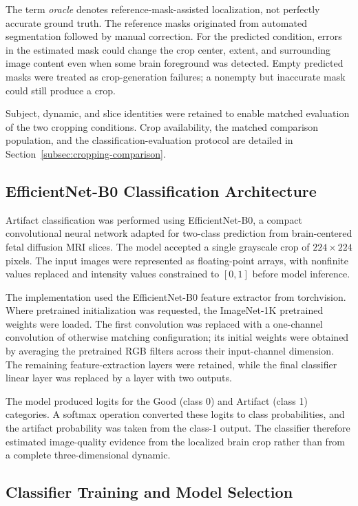 The term \emph{oracle} denotes reference-mask-assisted localization, not perfectly accurate ground truth. The reference masks originated from automated segmentation followed by manual correction. For the predicted condition, errors in the estimated mask could change the crop center, extent, and surrounding image content even when some brain foreground was detected. Empty predicted masks were treated as crop-generation failures; a nonempty but inaccurate mask could still produce a crop.

Subject, dynamic, and slice identities were retained to enable matched evaluation of the two cropping conditions. Crop availability, the matched comparison population, and the classification-evaluation protocol are detailed in Section~\ref{subsec:cropping-comparison}.

\subsection{EfficientNet-B0 Classification Architecture}
\label{subsec:2d_efficientnet_architecture}

Artifact classification was performed using EfficientNet-B0, a compact convolutional neural network adapted for two-class prediction from brain-centered fetal diffusion MRI slices. The model accepted a single grayscale crop of $224\times224$ pixels. The input images were represented as floating-point arrays, with nonfinite values replaced and intensity values constrained to $[0,1]$ before model inference.

The implementation used the EfficientNet-B0 feature extractor from torchvision. Where pretrained initialization was requested, the ImageNet-1K pretrained weights were loaded. The first convolution was replaced with a one-channel convolution of otherwise matching configuration; its initial weights were obtained by averaging the pretrained RGB filters across their input-channel dimension. The remaining feature-extraction layers were retained, while the final classifier linear layer was replaced by a layer with two outputs.

The model produced logits for the Good (class 0) and Artifact (class 1) categories. A softmax operation converted these logits to class probabilities, and the artifact probability was taken from the class-1 output. The classifier therefore estimated image-quality evidence from the localized brain crop rather than from a complete three-dimensional dynamic.

\subsection{Classifier Training and Model Selection}
\label{subsec:2d_classifier_training}

